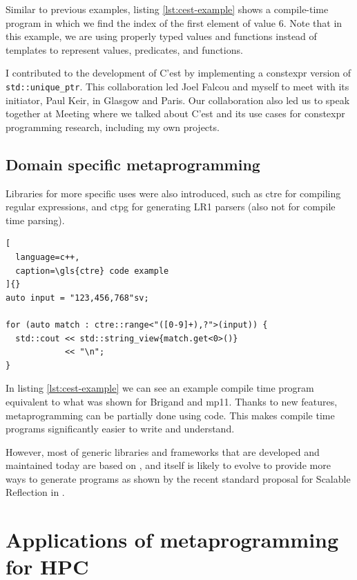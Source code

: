 \documentclass[../main]{subfiles}
\begin{document}
Similar to previous examples, listing \ref{lst:cest-example} shows a
compile-time program in which we find the index of the first element of value 6.
Note that in this example, we are using properly typed values and functions
instead of templates to represent values, predicates, and functions.

I contributed to the development of C'est by implementing a \gls{constexpr}
version of \lstinline{std::unique_ptr}. This collaboration led Joel Falcou
and myself to meet with its initiator, Paul Keir, in Glasgow and Paris.
Our collaboration also led us to speak together at
Meeting  \cite{meetingcpp22} where we talked about C'est and
its use cases for \gls{constexpr} programming research,
including my own projects.

\subsection{
  Domain specific metaprogramming
}

Libraries for more specific uses were also introduced, such as
\gls{ctre} \cite{ctre} for compiling regular expressions,
and \gls{ctpg} \cite{ctpg} for generating LR1 parsers
(also not for compile time parsing).

\begin{lstlisting}[
  language=c++,
  caption=\gls{ctre} code example
]{}
auto input = "123,456,768"sv;

for (auto match : ctre::range<"([0-9]+),?">(input)) {
  std::cout << std::string_view{match.get<0>()}
            << "\n";
}
\end{lstlisting}

In listing \ref{lst:cest-example} we can see an example compile time program
equivalent to what was shown for Brigand and mp11. Thanks to new \cpp features,
metaprogramming can be partially done using \cpp code. This makes
compile time programs significantly easier to write and understand.

However, most of generic libraries and frameworks that are developed
and maintained today are based on \cpp, and \cpp itself is likely to
evolve to provide more ways to generate programs as shown by the recent
standard proposal for Scalable Reflection in \cpp \cite{scalable-reflection}.

\section{
  Applications of metaprogramming for HPC
}
\end{document}
